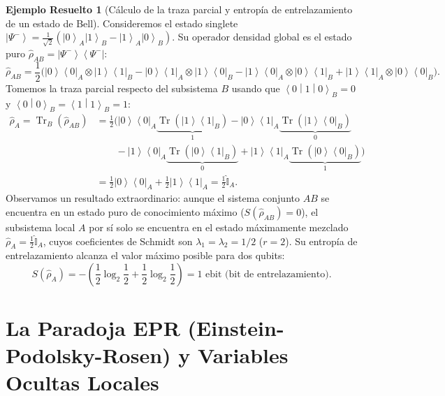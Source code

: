 \documentclass[11pt,a4paper,twoside]{report}
\theoremstyle{definition}
\newtheorem{ejemplo}{Ejemplo Resuelto}[chapter]
\theoremstyle{plain}
\theoremstyle{remark}
\newcommand{\ket}[1]{\left| #1 \right\rangle}
\newcommand{\braket}[2]{\left\langle #1 \middle| #2 \right\rangle}
\newcommand{\ketbra}[2]{\left| #1 \right\rangle\!\left\langle #2 \right|}
\newcommand{\mel}[3]{\left\langle #1 \middle| #2 \middle| #3 \right\rangle}
\newcommand{\tr}{\operatorname{Tr}}
\newcommand{\op}[1]{\hat{#1}}
\newcommand{\ident}{\hat{\mathbb{I}}}
\begin{document}
\begin{ejemplo}[Cálculo de la traza parcial y entropía de entrelazamiento de un estado de Bell]
Consideremos el estado singlete $\ket{\Psi^-} = \frac{1}{\sqrt{2}}(\ket{0}_A\ket{1}_B - \ket{1}_A\ket{0}_B)$. Su operador densidad global es el estado puro $\op{\rho}_{AB} = \ketbra{\Psi^-}{\Psi^-}$:
\begin{equation}
    \op{\rho}_{AB} = \frac{1}{2}\Big( \ketbra{0}{0}_A \otimes \ketbra{1}{1}_B - \ketbra{0}{1}_A \otimes \ketbra{1}{0}_B - \ketbra{1}{0}_A \otimes \ketbra{0}{1}_B + \ketbra{1}{1}_A \otimes \ketbra{0}{0}_B \Big).
\end{equation}
Tomemos la traza parcial respecto del subsistema $B$ usando que $\mel{0}{1}{0}_B = 0$ y $\braket{0}{0}_B = \braket{1}{1}_B = 1$:
\begin{align}
    \op{\rho}_A = \tr_B(\op{\rho}_{AB}) &= \frac{1}{2}\Big( \ketbra{0}{0}_A \underbrace{\tr(\ketbra{1}{1}_B)}_{1} - \ketbra{0}{1}_A \underbrace{\tr(\ketbra{1}{0}_B)}_{0} \nonumber \\
    &\qquad - \ketbra{1}{0}_A \underbrace{\tr(\ketbra{0}{1}_B)}_{0} + \ketbra{1}{1}_A \underbrace{\tr(\ketbra{0}{0}_B)}_{1} \Big) \nonumber \\
    &= \frac{1}{2}\ketbra{0}{0}_A + \frac{1}{2}\ketbra{1}{1}_A = \frac{1}{2}\ident_A.
\end{align}
Observamos un resultado extraordinario: aunque el sistema conjunto $AB$ se encuentra en un estado puro de conocimiento máximo ($S(\op{\rho}_{AB}) = 0$), el subsistema local $A$ por sí solo se encuentra en el estado máximamente mezclado $\op{\rho}_A = \frac{1}{2}\ident_A$, cuyos coeficientes de Schmidt son $\lambda_1 = \lambda_2 = 1/2$ ($r = 2$). Su entropía de entrelazamiento alcanza el valor máximo posible para dos qubits:
\begin{equation}
    S(\op{\rho}_A) = -\left(\frac{1}{2}\log_2\frac{1}{2} + \frac{1}{2}\log_2\frac{1}{2}\right) = 1\text{ ebit (bit de entrelazamiento)}.
\end{equation}
\end{ejemplo}

\section{La Paradoja EPR (Einstein-Podolsky-Rosen) y Variables Ocultas Locales}
\end{document}
